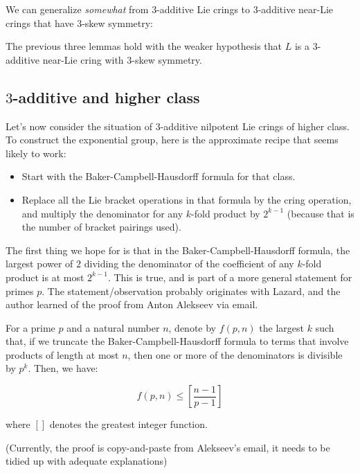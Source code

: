 \documentclass[10pt]{amsart}
\begin{document}
We can generalize {\em somewhat} from $3$-additive Lie crings to
$3$-additive near-Lie crings that have $3$-skew symmetry:

\begin{lemma}
  The previous three lemmas hold with the weaker hypothesis that $L$
  is a $3$-additive near-Lie cring with $3$-skew symmetry.
\end{lemma}

\subsection{$3$-additive and higher class}

Let's now consider the situation of $3$-additive nilpotent Lie
crings of higher class. To construct the exponential group, here is
the approximate recipe that seems likely to work:

\begin{itemize}
\item Start with the Baker-Campbell-Hausdorff formula for that class.
\item Replace all the Lie bracket operations in that formula by the
  cring operation, and multiply the denominator for any $k$-fold
  product by $2^{k-1}$ (because that is the number of bracket pairings
  used).
\end{itemize}

The first thing we hope for is that in the Baker-Campbell-Hausdorff
formula, the largest power of $2$ dividing the denominator of the
coefficient of any $k$-fold product is at most $2^{k-1}$. This is
true, and is part of a more general statement for primes $p$. The
statement/observation probably originates with Lazard, and the author
learned of the proof from Anton Alekseev via email.

\begin{lemma}
  For a prime $p$ and a natural number $n$, denote by $f(p,n)$ the
  largest $k$ such that, if we truncate the Baker-Campbell-Hausdorff
  formula to terms that involve products of length at most $n$, then
  one or more of the denominators is divisible by $p^k$. Then, we have:

  $$f(p,n) \le \left[\frac{n - 1}{p - 1}\right]$$

  where $[]$ denotes the greatest integer function.
\end{lemma}

(Currently, the proof is copy-and-paste from Alekseev's email, it
needs to be tidied up with adequate explanations)
\end{document}
